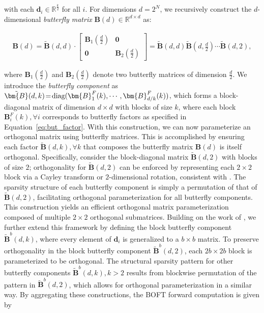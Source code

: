 with each $\bm{d}_i\in\mathbb{R}^{\frac{k}{2}}$ for all $i$. For dimensions $d=2^N$, we recursively construct the $d$-dimensional \emph{butterfly matrix} $\bm{B}(d)\in\mathbb{R}^{d\times d}$ as:

\begin{equation}
\begin{aligned}
    \!\!\bm{B}(d)=\tilde{\bm{B}}(d,d)\!\cdot\!\begin{bmatrix}
    \bm{B}_1(\frac{d}{2})\!\!\!\!\! & \bm{0} \\
    \bm{0}\!\!\!\!\! &\bm{B}_2(\frac{d}{2})
    \end{bmatrix}= \tilde{\bm{B}}(d,d)\tilde{\bm{B}}(d,\frac{d}{2})\cdots\tilde{\bm{B}}(d,2),
\end{aligned}
\end{equation}

where $\bm{B}_1(\frac{d}{2})$ and $\bm{B}_2(\frac{d}{2})$ denote two butterfly matrices of dimension $\frac{d}{2}$. We introduce the \emph{butterfly component} as $\thickmuskip=2mu \medmuskip=2mu \tilde{\bm{B}}(d,k)=\text{diag}(\bm{B}^F_1(k),\cdots,\bm{B}^F_{d/k}(k))$, which forms a block-diagonal matrix of dimension $d\times d$ with blocks of size $k$, where each block $\bm{B}^F_i(k),\forall i$ corresponds to butterfly factors as specified in Equation~\ref{eq:but_factor}. With this construction, we can now parameterize an orthogonal matrix using butterfly matrices. This is accomplished by ensuring each factor $\tilde{\bm{B}}(d,k),\forall k$ that composes the butterfly matrix $\bm{B}(d)$ is itself orthogonal. Specifically, consider the block-diagonal matrix $\tilde{\bm{B}}(d,2)$ with blocks of size $2$; orthogonality for $\tilde{\bm{B}}(d,2)$ can be enforced by representing each $2\times 2$ block via a Cayley transform or $2$-dimensional rotation, consistent with \cite{liu2021orthogonal,qiu2023controlling}. The sparsity structure of each butterfly component is simply a permutation of that of $\tilde{\bm{B}}(d,2)$, facilitating orthogonal parameterization for all butterfly components. This construction yields an efficient orthogonal matrix parameterization composed of multiple $2\times 2$ orthogonal submatrices. Building on the work of \cite{chen2022pixelated}, we further extend this framework by defining the block butterfly component $\tilde{\bm{B}}^b(d,k)$, where every element of $\bm{d}_i$ is generalized to a $b\times b$ matrix. To preserve orthogonality in the block butterfly component $\tilde{\bm{B}}^b(d,2)$, each $2b\times 2b$ block is parameterized to be orthogonal. The structural sparsity pattern for other butterfly components $\tilde{\bm{B}}^b(d,k),k>2$ results from blockwise permutation of the pattern in $\tilde{\bm{B}}^b(d,2)$, which allows for orthogonal parameterization in a similar way. By aggregating these constructions, the BOFT forward computation is given by

